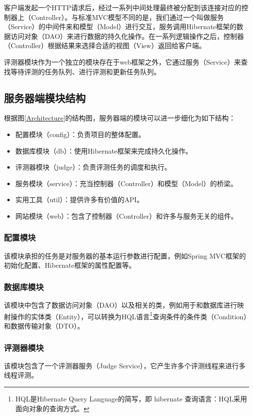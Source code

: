 客户端发起一个HTTP请求后，经过一系列中间处理最终被分配到该连接对应的控制器上（Controller）。与标准MVC模型不同的是，我们通过一个叫做服务（Service）的中间件来和模型（Model）进行交互，服务调用Hibernate框架的数据访问对象（DAO）来进行数据的持久化操作。在一系列逻辑操作之后，控制器（Controller）根据结果来选择合适的视图（View）返回给客户端。

评测器模块作为一个独立的模块存在于web框架之外，它通过服务（Service）来查找等待评测的任务队列、进行评测和更新任务队列。

\subsection{服务器端模块结构}\label{sec:serverModelStructure}
根据图\ref{Architecture}的结构图，服务器端的模块可以进一步细化为如下结构：
\begin{itemize}
	\item 配置模块（config）：负责项目的整体配置。
	\item 数据库模块（db）：使用Hibernate框架来完成持久化操作。
	\item 评测器模块（judge）：负责评测任务的调度和执行。
	\item 服务模块（service）：充当控制器（Controller）和模型（Model）的桥梁。
	\item 实用工具（util）：提供许多有价值的API。
	\item 网站模块（web）：包含了控制器（Controller）和许多与服务无关的组件。
\end{itemize}

\subsubsection{配置模块}
该模块承担的任务是对服务器的基本运行参数进行配置，例如Spring MVC框架的初始化配置、Hibernate框架的属性配置等。

\subsubsection{数据库模块}
该模块中包含了数据访问对象（DAO）以及相关的类，例如用于和数据库进行映射操作的实体类（Entity），可以转换为HQL语言\footnote{HQL是Hibernate Query Language的简写，即 hibernate 查询语言：HQL采用面向对象的查询方式。}查询条件的条件类（Condition）和数据传输对象（DTO）。

\subsubsection{评测器模块}
该模块包含了一个评测器服务（Judge Service），它产生许多个评测线程来进行多线程评测。

